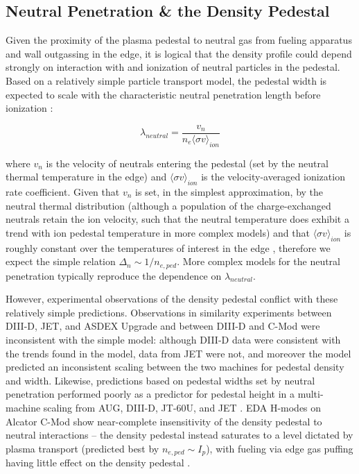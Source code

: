 \subsection{Neutral Penetration \& the Density Pedestal}\label{subsec:mod_neutral}

Given the proximity of the plasma pedestal to neutral gas from fueling apparatus and wall outgassing in the edge, it is logical that the density profile could depend strongly on interaction with and ionization of neutral particles in the pedestal.  Based on a relatively simple particle transport model, the pedestal width is expected to scale with the characteristic neutral penetration length before ionization \cite{Hughes2005,Mahdavi2002}:

\begin{equation}\label{eq:neutralpenetration}
 \lambda_{neutral} = \frac{v_n}{n_e \langle \sigma v \rangle_{ion}}
\end{equation}

\noindent where $v_n$ is the velocity of neutrals entering the pedestal (set by the neutral thermal temperature in the edge) and $\langle \sigma v \rangle_{ion}$ is the velocity-averaged ionization rate coefficient.  Given that $v_n$ is set, in the simplest approximation, by the neutral thermal distribution (although a population of the charge-exchanged neutrals retain the ion velocity, such that the neutral temperature does exhibit a trend with ion pedestal temperature in more complex models) and that $\langle \sigma v \rangle_{ion}$ is roughly constant over the temperatures of interest in the edge \cite{Hughes2005}, therefore we expect the simple relation $\Delta_{n} \sim 1/n_{e,ped}$.  More complex models for the neutral penetration typically reproduce the dependence on $\lambda_{neutral}$.

However, experimental observations of the density pedestal conflict with these relatively simple predictions.    Observations in similarity experiments between DIII-D, JET, and ASDEX Upgrade \cite{Beurskens2011} and between DIII-D and C-Mod \cite{Mossessian2003} were inconsistent with the simple model: although DIII-D data were consistent with the trends found in the model, data from JET were not, and moreover the model predicted an inconsistent scaling between the two machines for pedestal density and width.  Likewise, predictions based on pedestal widths set by neutral penetration performed poorly as a predictor for pedestal height in a multi-machine scaling from AUG, DIII-D, JT-60U, and JET \cite{Onjun2002}.  EDA H-modes on Alcator C-Mod show near-complete insensitivity of the density pedestal to neutral interactions -- the density pedestal instead saturates to a level dictated by plasma transport (predicted best by $n_{e,ped} \sim I_p$), with fueling via edge gas puffing having little effect on the density pedestal \cite{Hughes2006,Hughes2007}.

